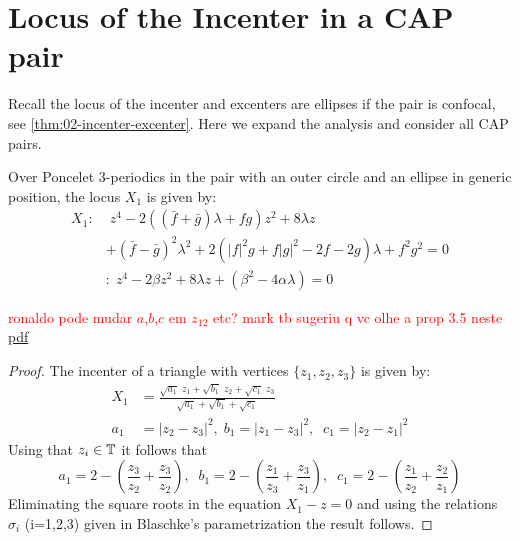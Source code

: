 \section{Locus of the Incenter in a CAP pair}
\label{sec:07-proof-theorem}

Recall the locus of the incenter and excenters are ellipses if the pair is confocal, see \cref{thm:02-incenter-excenter}. Here we expand the analysis and consider all CAP pairs.

\begin{proposition}
\label{prop:07-X1c}
Over Poncelet 3-periodics in the pair with an outer circle and an ellipse in generic position, the locus $X_1$ is given by:
\begin{align*}
  X_1:&\;z^4 - 2(( \bar{f} + \bar{g}) \lambda +  f g) z^2 + 8   \lambda z\\
  &+ (\bar{f} - \bar{g})^2 \lambda^2 +2 (  |f|^2 g +   f |g|^2 - 2 f - 2 g) \lambda + f^2 g^2=0\\
  \;&:\;  z^4 - 2\beta  z^2+ 8\lambda z+  (\beta^2-4\alpha\lambda) =0
\end{align*}
\end{proposition}
\textcolor{red}{ronaldo pode mudar $a$,$b$,$c$ em $z_{12}$ etc?}
\textcolor{red}{mark tb sugeriu q vc olhe a prop 3.5 neste \href{https://studymath.github.io/assets/docs/real_complex_bash.pdf
}{pdf}}
\begin{proof} The incenter of a triangle with vertices $\{z_1,z_2,z_3\}$ is given by:
\begin{align*}
    X_1&=\frac{\sqrt{a_1}\;z_1+\sqrt{b_1}\;z_2+\sqrt{c_1}\;z_3}{\sqrt{a_1}+\sqrt{b_1}+\sqrt{c_1}}\\
    a_1&=|z_2-z_3|^2, \; b_1=|z_1-z_3|^2, \;\; c_1=|z_2-z_1|^2
\end{align*}
Using that $z_i\in \mathbb{T}$ it follows that
\[a_1=2-(\frac{z_3}{z_2}+\frac{z_3}{z_2}),\;\; b_1=2-(\frac{z_1}{z_3}+\frac{z_3}{z_1}),\;\;c_1=2-(\frac{z_1}{z_2}+\frac{z_2}{z_1})\]
Eliminating the square roots in  the equation $X_1-z=0$ and using the relations  $\sigma_i$ (i=1,2,3) given in Blaschke's parametrization the result follows.
\end{proof}


